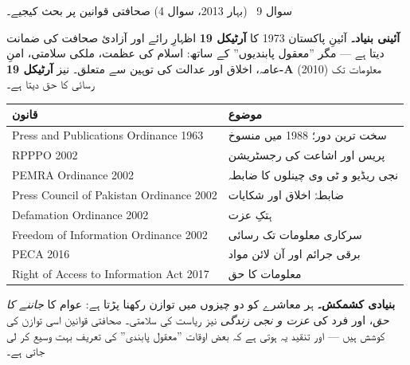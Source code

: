 \begin{sawal}{سوال \textenglish{9} \ \textnormal{\small(بہار \textenglish{2013}، سوال \textenglish{4})}}
صحافتی قوانین پر بحث کیجیے۔
\end{sawal}

\begin{hal}
\textbf{آئینی بنیاد۔} آئینِ پاکستان \textenglish{1973} کا \textbf{آرٹیکل
\textenglish{19}} اظہارِ رائے اور آزادیٔ صحافت کی ضمانت دیتا ہے --- مگر
''معقول پابندیوں'' کے ساتھ: اسلام کی عظمت، ملکی سلامتی، امنِ عامہ، اخلاق اور
عدالت کی توہین سے متعلق۔ نیز \textbf{آرٹیکل \textenglish{19-A}}
(\textenglish{2010}) معلومات تک رسائی کا حق دیتا ہے۔

\medskip
\begin{center}
\begin{tabular}{@{}p{6.4cm} p{8.0cm}@{}}
\toprule
\textbf{قانون} & \textbf{موضوع} \\
\midrule
\textenglish{Press and Publications Ordinance 1963} & سخت ترین دور؛ \textenglish{1988} میں منسوخ \\
\textenglish{RPPPO 2002} & پریس اور اشاعت کی رجسٹریشن \\
\textenglish{PEMRA Ordinance 2002} & نجی ریڈیو و ٹی وی چینلوں کا ضابطہ \\
\textenglish{Press Council of Pakistan Ordinance 2002} & ضابطۂ اخلاق اور شکایات \\
\textenglish{Defamation Ordinance 2002} & ہتکِ عزت \\
\textenglish{Freedom of Information Ordinance 2002} & سرکاری معلومات تک رسائی \\
\textenglish{PECA 2016} & برقی جرائم اور آن لائن مواد \\
\textenglish{Right of Access to Information Act 2017} & معلومات کا حق \\
\bottomrule
\end{tabular}
\end{center}

\medskip
\textbf{بنیادی کشمکش۔} ہر معاشرے کو دو چیزوں میں توازن رکھنا پڑتا ہے: عوام کا
\emph{جاننے کا حق}، اور فرد کی \emph{عزت و نجی زندگی} نیز ریاست کی سلامتی۔
صحافتی قوانین اسی توازن کی کوشش ہیں --- اور تنقید یہ ہوتی ہے کہ بعض اوقات
''معقول پابندی'' کی تعریف بہت وسیع کر لی جاتی ہے۔

\end{hal}


